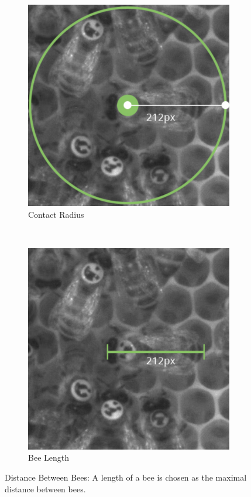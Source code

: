 \begin{figure}[b]
	\centering
	\begin{subfigure}[b]{0.45\textwidth}
		\centering
		\includegraphics[width=\textwidth]{Figures/radius}
		\caption[Contact Radius]{Contact Radius}
		\label{fig:radius}
	\end{subfigure}
	~ %
	\begin{subfigure}[b]{0.45\textwidth}
		\includegraphics[width=\textwidth]{Figures/sizeTagBee}
		\caption[Bee and Tag Size]{Bee Length}
		\label{fig:size}
	\end{subfigure}
	\caption{Distance Between Bees: A length of a bee is chosen as the maximal  distance between bees.}
	\label{fig:contactRadius}
\end{figure}


